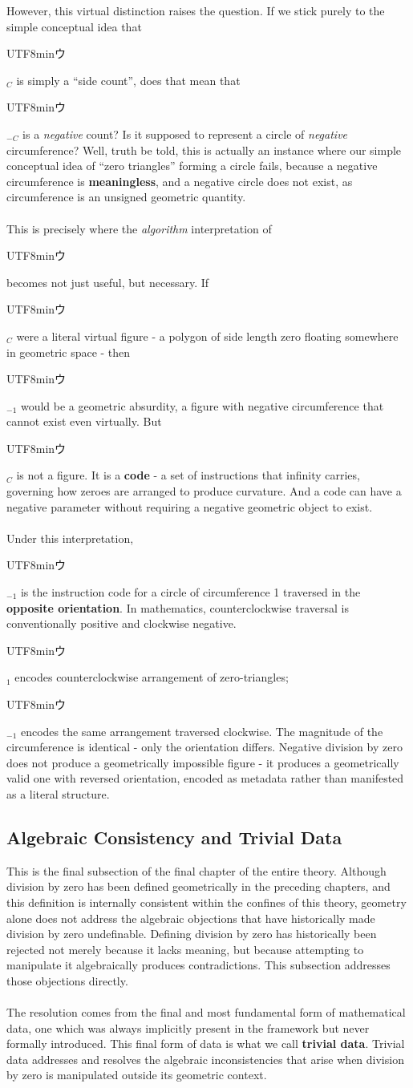 \documentclass{article}
\newcommand{\U}{\begin{CJK}{UTF8}{min}ウ\end{CJK}}
\begin{document}
However, this virtual distinction raises the question. If we stick purely to the simple conceptual idea that \U$_C$ is simply a ``side count'', does that mean that \U$_{-C}$ is a \textit{negative} count? Is it supposed to represent a circle of \textit{negative} circumference? Well, truth be told, this is actually an instance where our simple conceptual idea of ``zero triangles'' forming a circle fails, because a negative circumference is \textbf{meaningless}, and a negative circle does not exist, as circumference is an unsigned geometric quantity. \\\\
This is precisely where the \textit{algorithm} interpretation of \U{} becomes 
not just useful, but necessary. If \U$_C$ were a literal virtual figure - a 
polygon of side length zero floating somewhere in geometric space - then 
\U$_{-1}$ would be a geometric absurdity, a figure with negative circumference 
that cannot exist even virtually. But \U$_C$ is not a figure. It is a 
\textbf{code} - a set of instructions that infinity carries, governing how 
zeroes are arranged to produce curvature. And a code can have a negative 
parameter without requiring a negative geometric object to exist.\\\\
Under this interpretation, \U$_{-1}$ is the instruction code for a circle of 
circumference 1 traversed in the \textbf{opposite orientation}. In mathematics, 
counterclockwise traversal is conventionally positive and clockwise negative. 
\U$_1$ encodes counterclockwise arrangement of zero-triangles; \U$_{-1}$ 
encodes the same arrangement traversed clockwise. The magnitude of the 
circumference is identical - only the orientation differs. Negative division by zero does not produce a 
geometrically impossible figure - it produces a geometrically valid one with 
reversed orientation, encoded as metadata rather than manifested as a literal 
structure.

\subsection{Algebraic Consistency and Trivial Data}

This is the final subsection of the final chapter of the entire theory. 
Although division by zero has been defined geometrically in the preceding 
chapters, and this definition is internally consistent within the confines of this theory, geometry alone does not address the algebraic objections that have 
historically made division by zero undefinable. Defining division 
by zero has historically been rejected not merely because it lacks meaning, 
but because attempting to manipulate it algebraically produces contradictions. 
This subsection addresses those objections directly.
\\\\The resolution comes from the final and most fundamental form of mathematical 
data, one which was always implicitly present in the framework but never 
formally introduced. This final form of data is what we call \textbf{trivial data}. Trivial data addresses and resolves the algebraic inconsistencies that 
arise when division by zero is manipulated outside its geometric context.
\end{document}
